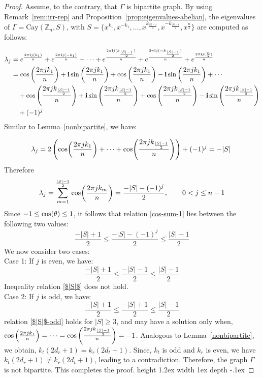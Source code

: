 \documentclass[12pt]{article}
\def\sin{{\rm{sin}}}
\def\cos{{\rm{cos}}}
\def\bull{\vrule height 1.2ex width 1ex depth -.1ex }
\begin{document}
\begin{proof}
Assume, to the contrary, that $\Gamma$ is bipartite graph. By using Remark~\ref{rem:irr-rep} and Proposition~\ref{prop:eigenvalues-abelian}, the eigenvalues of $\Gamma = \mathrm{Cay}(\mathbb{Z}_n, S)$, with  $S = \{x^{k_1}, x^{-k_1}, \dots, x^{k_{\frac{|S|-1}{2}}}, x^{-k_{\frac{|S|-1}{2}}},x^{\frac{n}{2}}\}$ are computed as follows:

	\[
	\begin{aligned}
		\lambda_j &=
		e^{\frac{2 \pi \mathbf{i} j (k_1)}{n}}
		+ e^{\frac{2 \pi \mathbf{i} j (-k_1)}{n}}
		+ \cdots
		+ e^{\frac{2 \pi \mathbf{i} j (k_{\frac{|S|-1}{2}})}{n}}
		+ e^{\frac{2 \pi \mathbf{i} j (-k_{\frac{|S|-1}{2}})}{n}}
		+ e^{\frac{2 \pi \mathbf{i} j (\frac{n}{2})}{n}} \\
		&=
		\cos\left(\frac{2 \pi j k_1}{n}\right)
		+ \mathbf{i}\,\sin\left(\frac{2 \pi j k_1}{n}\right)
		+ \cos\left(\frac{2 \pi j k_1}{n}\right)
		- \mathbf{i}\,\sin\left(\frac{2 \pi j k_1}{n}\right)
		+ \cdots \\
		&\quad + \cos\left(\frac{2 \pi j k_{\frac{|S|-1}{2}}}{n}\right)
		+ \mathbf{i}\,\sin\left(\frac{2 \pi j k_{\frac{|S|-1}{2}}}{n}\right)
		+ \cos\left(\frac{2 \pi j k_{\frac{|S|-1}{2}}}{n}\right)
		- \mathbf{i}\,\sin\left(\frac{2 \pi j k_{\frac{|S|-1}{2}}}{n}\right) \\
	    &\quad 	+ (-1)^ j
    	\end{aligned}
          \]
Similar to Lemma~\ref{nonbipartite}, we have:

	\[
	\lambda_j
	= 2\left(
	\cos\!\left(\frac{2\pi j k_1}{n}\right)
	+ \cdots
	+ \cos\!\left(\frac{2\pi j k_{\frac{|S|-1}{2}}}{n}\right)
	\right) + (-1)^j
	= -|S| \;
	\]
Therefore
\begin{equation}\label{cos-sum-1}
	\lambda_j
	= \sum_{m=1}^{\frac{|S|-1}{2}}
	\cos\!\left(\frac{2\pi j k_m}{n}\right)
	= \frac{-|S|-(-1)^j}{2},
	\qquad 0 < j \le n-1
\end{equation}	
Since $ -1 \le \cos(\theta) \le 1$, it follows that relation \eqref{cos-sum-1} lies between the following two values:
    \[
     \frac{-|S|+1}{2} \le \frac{-|S|-(-1)^j}{2} \le \frac{|S|-1}{2}
    \]
We now consider two cases:\\
Case 1: If $j$ is even, we have:
    \begin{equation}\label{$|S|$}
     \frac{-|S|+1}{2} \le \frac{-|S|-1}{2} \le \frac{|S|-1}{2}	
   \end{equation}
   Ineqeality relation \eqref{$|S|$} does not hold.\\
   Case 2: If $j$ is odd, we have:
   	 \begin{equation}\label{$|S|$-odd}
   		\frac{-|S|+1}{2} \le \frac{-|S|+1}{2} \le \frac{|S|-1}{2}	
   	\end{equation}
relation \eqref{$|S|$-odd} holds for $|S|\geq3 $, and may have a solution only when, $
\cos\left(\frac{2\pi j k_1}{n}\right)
= \cdots
= \cos\left(\frac{2\pi j k_{\frac{|S|-1}{2}}}{n}\right)
= -1$. Analogous to Lemma~\ref{nonbipartite}, we obtain, $k_t \left( 2 d_r + 1 \right) = k_r \left( 2 d_t + 1 \right)$. Since, $k_t$ is odd and $k_r$ is even, we have $k_t (2 d_r + 1) \neq k_r (2 d_t + 1)$, leading to a contradiction. Therefore, the graph $\Gamma$ is not bipartite. This completes the proof. \hfill\bull
	\end{proof}
\end{document}
